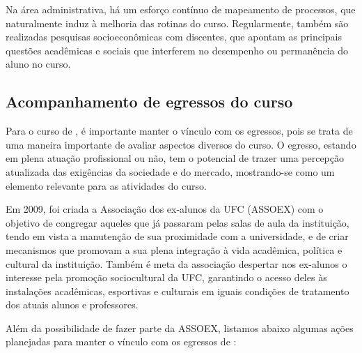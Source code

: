 Na área administrativa, há um esforço contínuo de mapeamento de processos, que naturalmente induz à melhoria das rotinas do curso. Regularmente, também são realizadas pesquisas socioeconômicas com discentes, que apontam as principais questões acadêmicas e sociais que interferem no desempenho ou permanência do aluno no curso.

\subsection{Acompanhamento de egressos do curso}

Para o curso de \nomedocurso, é importante manter o vínculo com os egressos, pois se trata de uma maneira importante de avaliar aspectos diversos do curso. O egresso, estando em plena atuação profissional ou não, tem o potencial de trazer uma percepção atualizada das exigências da sociedade e do mercado, mostrando-se como um elemento relevante para as atividades do curso.

Em 2009, foi criada a Associação dos ex-alunos da UFC (ASSOEX) com o objetivo de congregar aqueles que já passaram pelas salas de aula da instituição, tendo em vista a manutenção de sua proximidade com a universidade, e de criar mecanismos que promovam a sua plena integração à vida acadêmica, política e cultural da instituição. Também é meta da associação despertar nos ex-alunos o interesse pela promoção sociocultural da UFC, garantindo o acesso deles às instalações acadêmicas, esportivas e culturais em iguais condições de tratamento dos atuais alunos e professores.

Além da possibilidade de fazer parte da ASSOEX, listamos abaixo algumas ações planejadas para manter o vínculo com os egressos de \nomedocurso:

